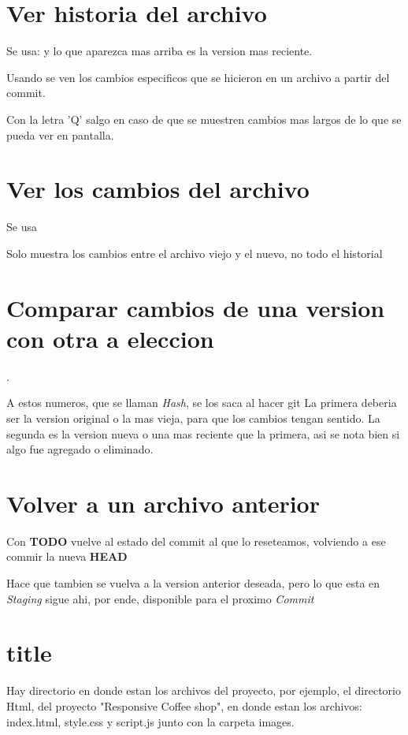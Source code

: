\documentclass[]{article} %
\begin{document}
\section*{Ver historia del archivo}
Se usa:  y lo que aparezca mas arriba es la version mas reciente.

Usando  se ven los cambios especificos que se hicieron en un archivo a partir del commit.

Con la letra 'Q' salgo en caso de que se muestren cambios mas largos de lo que se pueda ver en pantalla.

\section*{Ver los cambios del archivo}
Se usa 

Solo muestra los cambios entre el archivo viejo y el nuevo, no todo el historial

\section*{Comparar cambios de una version con otra a eleccion}
.

A estos numeros, que se llaman \textit{Hash}, se los saca al hacer git 
La primera deberia ser la version original o la mas vieja, para que los cambios tengan sentido.
La segunda es la version nueva o una mas reciente que la primera, asi se nota bien si algo fue agregado o eliminado.

\section*{Volver a un archivo anterior}
Con  \textbf{TODO} vuelve al estado del commit al que lo reseteamos, volviendo a ese commir la nueva \textbf{HEAD}

 Hace que tambien se vuelva a la version anterior deseada, pero lo que esta en \textit{Staging} sigue ahi, por ende, disponible para el proximo \textit{Commit}

\pagebreak

\section*{title}
Hay directorio en donde estan los archivos del proyecto, por ejemplo, el directorio Html, del proyecto "Responsive Coffee shop", en donde estan los archivos: index.html, style.css y script.js junto con la carpeta images.
\end{document}
